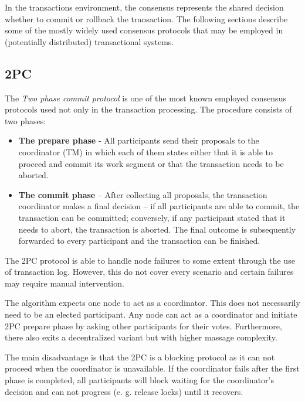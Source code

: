 \documentclass[oneside,
  digital, %
  table,   %
  nolof,     %
  nolot,     %
]{fithesis3}
\begin{document}
In the transactions environment, the consensus represents the shared decision whether to commit or rollback the transaction. The following sections describe some of the mostly widely used consensus protocols that may be employed in (potentially distributed) transactional systems.

\subsection{2PC}

The \textit{Two phase commit protocol} is one of the most known employed consensus protocols used not only in the transaction processing. The procedure consists of two phases:

\begin{itemize}
    \item \textbf{The prepare phase} - All participants send their proposals to the coordinator (TM) in which each of them states either that it is able to proceed and commit its work segment or that the transaction needs to be aborted.
    
    \item \textbf{The commit phase} -- After collecting all proposals, the transaction coordinator makes a final decision -- if all participants are able to commit, the transaction can be committed; conversely, if any participant stated that it needs to abort, the transaction is aborted. The final outcome is subsequently forwarded to every participant and the transaction can be finished.
\end{itemize}

The 2PC protocol is able to handle node failures to some extent through the use of transaction log. However, this do not cover every scenario and certain failures may require manual intervention.

The algorithm expects one node to act as a coordinator. This does not necessarily need to be an elected participant. Any node can act as a coordinator and initiate 2PC prepare phase by asking other participants for their votes. Furthermore, there also exits a decentralized variant but with higher massage complexity.

The main disadvantage is that the 2PC is a blocking protocol as it can not proceed when the coordinator is unavailable. If the coordinator fails after the first phase is completed, all participants will block waiting for the coordinator's decision and can not progress (e. g. release locks) until it recovers.
\end{document}
